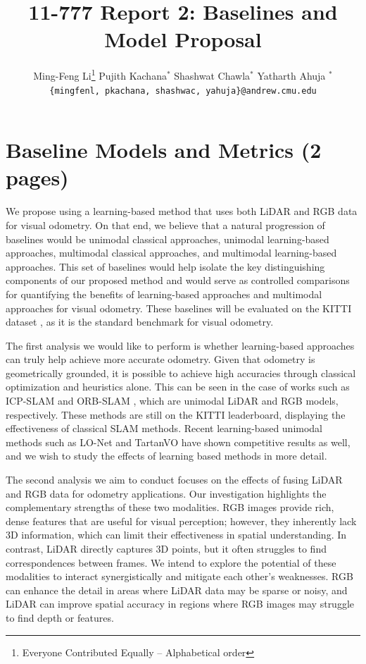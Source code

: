 \documentclass[11pt,a4paper]{article}
\title{11-777 Report 2: Baselines and Model Proposal}
\author{
  Ming-Feng Li\thanks{\hspace{4pt}Everyone Contributed Equally -- Alphabetical order} \hspace{2em} Pujith Kachana$^*$ \hspace{2em} Shashwat Chawla$^*$ \hspace{2em} Yatharth Ahuja $^*$ \\
  \texttt{\{mingfenl, pkachana, shashwac, yahuja\}@andrew.cmu.edu}
  }
\date{}
\begin{document}
\maketitle

\section{Baseline Models and Metrics (2 pages)}

We propose using a learning-based method that uses both LiDAR and RGB data for visual odometry. On that end, we believe that a natural progression of baselines would be unimodal classical approaches, unimodal learning-based approaches, multimodal classical approaches, and multimodal learning-based approaches. This set of baselines would help isolate the key distinguishing components of our proposed method and would serve as controlled comparisons for quantifying the benefits of learning-based approaches and multimodal approaches for visual odometry. These baselines will be evaluated on the KITTI dataset \cite{KITTI}, as it is the standard benchmark for visual odometry.

The first analysis we would like to perform is whether learning-based approaches can truly help achieve more accurate odometry. Given that odometry is geometrically grounded, it is possible to achieve high accuracies through classical optimization and heuristics alone. This can be seen in the case of works such as ICP-SLAM \cite{KISS-ICP} and ORB-SLAM \cite{orb-slam}, which are unimodal LiDAR and RGB models, respectively. These methods are still on the KITTI leaderboard, displaying the effectiveness of classical SLAM methods. Recent learning-based unimodal methods such as LO-Net \cite{lo-net} and TartanVO \cite{tartanvo} have shown competitive results as well, and we wish to study the effects of learning based methods in more detail.

The second analysis we aim to conduct focuses on the effects of fusing LiDAR and RGB data for odometry applications. Our investigation highlights the complementary strengths of these two modalities. RGB images provide rich, dense features that are useful for visual perception; however, they inherently lack 3D information, which can limit their effectiveness in spatial understanding. In contrast, LiDAR directly captures 3D points, but it often struggles to find correspondences between frames. We intend to explore the potential of these modalities to interact synergistically and mitigate each other's weaknesses. RGB can enhance the detail in areas where LiDAR data may be sparse or noisy, and LiDAR can improve spatial accuracy in regions where RGB images may struggle to find depth or features.
\end{document}
